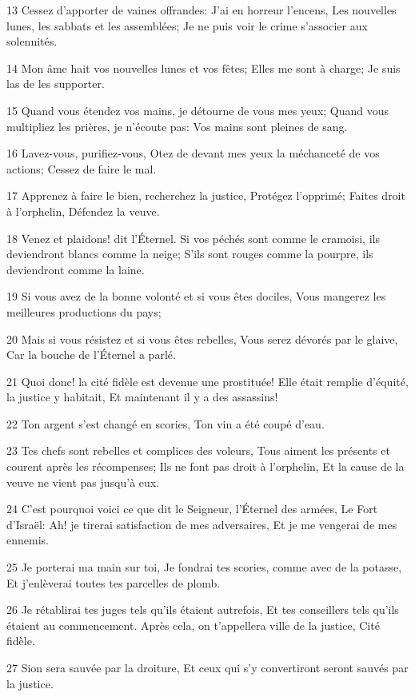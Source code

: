 \par 13 Cessez d'apporter de vaines offrandes: J'ai en horreur l'encens, Les nouvelles lunes, les sabbats et les assemblées; Je ne puis voir le crime s'associer aux solennités.
\par 14 Mon âme hait vos nouvelles lunes et vos fêtes; Elles me sont à charge; Je suis las de les supporter.
\par 15 Quand vous étendez vos mains, je détourne de vous mes yeux; Quand vous multipliez les prières, je n'écoute pas: Vos mains sont pleines de sang.
\par 16 Lavez-vous, purifiez-vous, Otez de devant mes yeux la méchanceté de vos actions; Cessez de faire le mal.
\par 17 Apprenez à faire le bien, recherchez la justice, Protégez l'opprimé; Faites droit à l'orphelin, Défendez la veuve.
\par 18 Venez et plaidons! dit l'Éternel. Si vos péchés sont comme le cramoisi, ils deviendront blancs comme la neige; S'ils sont rouges comme la pourpre, ils deviendront comme la laine.
\par 19 Si vous avez de la bonne volonté et si vous êtes dociles, Vous mangerez les meilleures productions du pays;
\par 20 Mais si vous résistez et si vous êtes rebelles, Vous serez dévorés par le glaive, Car la bouche de l'Éternel a parlé.
\par 21 Quoi donc! la cité fidèle est devenue une prostituée! Elle était remplie d'équité, la justice y habitait, Et maintenant il y a des assassins!
\par 22 Ton argent s'est changé en scories, Ton vin a été coupé d'eau.
\par 23 Tes chefs sont rebelles et complices des voleurs, Tous aiment les présents et courent après les récompenses; Ils ne font pas droit à l'orphelin, Et la cause de la veuve ne vient pas jusqu'à eux.
\par 24 C'est pourquoi voici ce que dit le Seigneur, l'Éternel des armées, Le Fort d'Israël: Ah! je tirerai satisfaction de mes adversaires, Et je me vengerai de mes ennemis.
\par 25 Je porterai ma main sur toi, Je fondrai tes scories, comme avec de la potasse, Et j'enlèverai toutes tes parcelles de plomb.
\par 26 Je rétablirai tes juges tels qu'ils étaient autrefois, Et tes conseillers tels qu'ils étaient au commencement. Après cela, on t'appellera ville de la justice, Cité fidèle.
\par 27 Sion sera sauvée par la droiture, Et ceux qui s'y convertiront seront sauvés par la justice.

